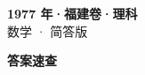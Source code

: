 \documentclass[zihao=-4, a4paper]{ctexart}
\begin{document}
\begin{center}
  {\Large\bfseries 1977 年·福建卷·理科}\\[4pt]
  {\large 数学 · 简答版}
\end{center}
\medskip
{}

\clearpage
{}
\begin{center}{\Large\bfseries 答案速查}\end{center}
\medskip

\end{document}
